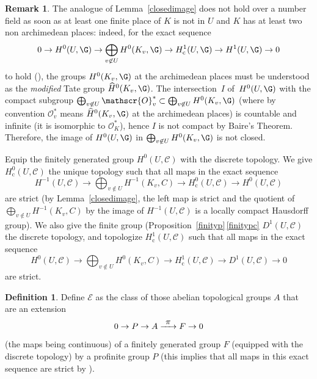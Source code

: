 \documentclass[JEP,XML,SOM,Unicode, NoEqCountersInSection]{cedram}
\let\mathcal\mathscr
\newcommand\To[1]{\mathchoice{\xrightarrow{\textstyle\kern4pt#1\kern3pt}}{\stackrel{#1}{\longrightarrow}}{}{}}
\newcommand{\rc}{\mathrm{c}}
\theoremstyle{plain}
\theoremstyle{definition}
\newtheorem{defi}[theo]{Definition}
\newtheorem{rema}[theo]{Remark}
\newcommand\cO {\mathcal{O}}
\newcommand \cC {\mathcal{C}}
\begin{document}
\begin{rema} \label{nocdn}
The analogue of Lemma~\ref{closedimage} does not hold over a number field
as soon as at least one finite place of $K$ is not in $U$ and $K$ has at
least two non archimedean places: indeed, for the exact sequence\vspace*{-3pt}
\[
0 \to H^0(U,\G) \to \bigoplus_{v \not \in U} H^0(K_v,\G) \to
H^1_\rc(U,\G) \to H^1(U,\G) \to 0
\]
to hold (\cf \cite[beginning of \S 2]{DemH}),
the groups $H^0(K_v,\G)$ at the archimedean places
must be understood as the \emph{modified} Tate group ${\widehat H}^0(K_v,\G)$.
The intersection~$I$ of~$H^0(U,\G)$ with
the compact subgroup
$\bigoplus_{v \not \in U} \cO_v^* \subset
\bigoplus_{v \not \in U} H^0(K_v,\G) $ (where by convention $\cO_v^*$
means ${\widehat H}^0(K_v,\G)$ at the archimedean places) is countable
and infinite (it is isomorphic to $\cO_K^*$),
hence $I$ is not compact by Baire's Theorem.
Therefore, the image of $H^0(U,\G)$ in $\bigoplus_{v \not \in U} H^0(K_v,\G)$
is not closed.
\end{rema}

Equip the finitely generated group $H^0(U,\cC)$ with the discrete
topology. We give $H^0_\rc(U, \cC)$ the unique topology such that all maps in
the exact sequence
\begin{equation} \label {toph0c}
H^{-1}(U,\cC)
\to \bigoplus_{v \not \in U} H^{-1}(K_v,C) \to H^0_\rc(U, \cC) \to H^0(U,\cC)
\end{equation}
are strict (by Lemma~\ref{closedimage}, the left map is strict and the
quotient of $\bigoplus_{v \not \in U} H^{-1}(K_v,C)$ by the image of
$H^{-1}(U,\cC)$ is a locally compact Hausdorff group).
We also give the finite group (\cf Proposition~\ref{finityp}\,\eqref{finitypc}
$D^1(U,\cC)$ the discrete topology, and topologize $H^1_\rc(U,\cC)$ such that
all maps in the exact sequence
\begin{equation} \label {toph1c}
H^0(U,\cC) \to \bigoplus_{v \not \in U} H^0(K_v,C) \to H^1_\rc(U, \cC) \to D^1(U,\cC) \to 0
\end{equation}
are strict.

\begin{defi}
Define ${\mathcal E}$ as the class of those abelian topological groups
$A$ that are an extension
\begin{equation} \label{extgroup}
0 \to P \to A \To{\pi}F \to 0
\end{equation}
(the maps being continuous)
of a finitely generated group $F$ (equipped with the
discrete topology) by a profinite group $P$ (this implies that all maps
in this exact sequence are strict by \cite[Lem.\,3.4]{DemH}).
\end{defi}
\end{document}
